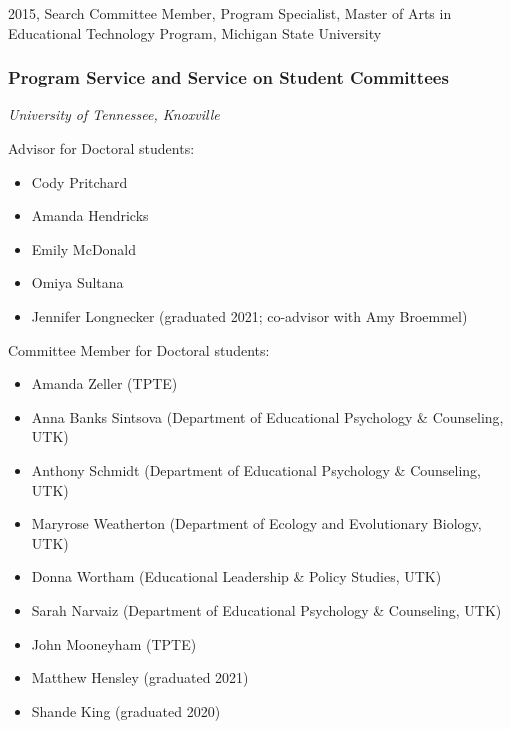 \documentclass[
  14,
]{article}
\providecommand{\tightlist}{%
  \setlength{\itemsep}{0pt}\setlength{\parskip}{0pt}}
\begin{document}
2015, Search Committee Member, Program Specialist, Master of Arts in
Educational Technology Program, Michigan State University

\hypertarget{program-service-and-service-on-student-committees}{%
\subsubsection{Program Service and Service on Student
Committees}\label{program-service-and-service-on-student-committees}}

\emph{University of Tennessee, Knoxville}

Advisor for Doctoral students:

\begin{itemize}
\tightlist
\item
  Cody Pritchard
\item
  Amanda Hendricks\\
\item
  Emily McDonald\\
\item
  Omiya Sultana\\
\item
  Jennifer Longnecker (graduated 2021; co-advisor with Amy Broemmel)
\end{itemize}

Committee Member for Doctoral students:

\begin{itemize}
\tightlist
\item
  Amanda Zeller (TPTE)\\
\item
  Anna Banks Sintsova (Department of Educational Psychology \&
  Counseling, UTK)\\
\item
  Anthony Schmidt (Department of Educational Psychology \& Counseling,
  UTK)\\
\item
  Maryrose Weatherton (Department of Ecology and Evolutionary Biology,
  UTK)\\
\item
  Donna Wortham (Educational Leadership \& Policy Studies, UTK)\\
\item
  Sarah Narvaiz (Department of Educational Psychology \& Counseling,
  UTK)\\
\item
  John Mooneyham (TPTE)\\
\item
  Matthew Hensley (graduated 2021)\\
\item
  Shande King (graduated 2020)
\end{itemize}
\end{document}
